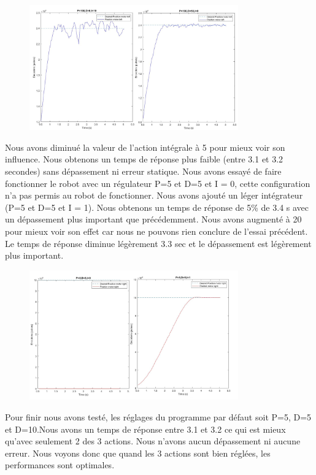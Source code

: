 \documentclass[a4paper]{article}
\begin{document}
		\begin{figure}[h]
			\centering
			\includegraphics[width = 9cm]{imgs/fig3.png}
			\caption{}
		\end{figure}
		Nous avons diminué la valeur de l’action intégrale à 5 pour mieux voir son influence. Nous obtenons un temps de réponse plus faible (entre 3.1 et 3.2 secondes) sans dépassement ni erreur statique.
		Nous avons essayé de faire fonctionner le robot avec un régulateur P=5 et D=5 et I = 0, cette configuration n’a pas permis au robot de fonctionner. Nous avons ajouté un léger intégrateur (P=5 et D=5 et I = 1). Nous obtenons un temps de réponse de 5\% de 3.4 s avec un dépassement plus important que précédemment. Nous avons augmenté à 20 pour mieux voir son effet car nous ne pouvons rien conclure de l’essai précédent.  Le temps de réponse diminue légèrement 3.3 sec et le dépassement est légèrement plus important.
		
		\begin{figure}[h]
			\centering
			\includegraphics[width = 9cm]{imgs/fig4.png}
			\caption{}
		\end{figure}
		Pour finir nous avons testé, les réglages du programme par défaut soit P=5, D=5 et D=10.Nous avons un temps de réponse entre 3.1 et 3.2 ce qui est mieux qu’avec seulement 2 des 3 actions. Nous n’avons aucun dépassement ni aucune erreur. Nous voyons donc que quand les 3 actions sont bien réglées, les performances sont optimales.
		
\end{document}
